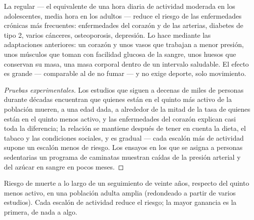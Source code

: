 \begin{proposition}\label{prop:g10:sport-and-health:health}
La  regular --- el equivalente de una hora diaria de
actividad moderada en los adolescentes, media hora en los adultos ---
reduce el riesgo de las enfermedades crónicas más frecuentes:
enfermedades del corazón y de las arterias, diabetes de tipo 2, varios
cánceres, osteoporosis, depresión. Lo hace mediante las adaptaciones
anteriores: un corazón y unos vasos que trabajan a menor presión, unos
músculos que toman con facilidad glucosa de la sangre, unos huesos que
conservan su masa, una masa corporal dentro de un intervalo saludable.
El efecto es grande --- comparable al de no fumar --- y no exige
deporte, solo movimiento.
\end{proposition}
\begin{proof}[Pruebas experimentales]
Los estudios que siguen a decenas de miles de personas durante décadas
encuentran que quienes están en el quinto más activo de la población
mueren, a una edad dada, a alrededor de la mitad de la tasa de quienes
están en el quinto menos activo, y las enfermedades del corazón
explican casi toda la diferencia; la relación se mantiene después de
tener en cuenta la dieta, el tabaco y las condiciones sociales, y es
gradual --- cada escalón más de actividad supone un escalón menos de
riesgo. Los ensayos en los que se asigna a personas sedentarias un
programa de caminatas muestran caídas de la presión arterial y del
azúcar en sangre en pocos meses.
\end{proof}

\begin{omfigure}

{\small Riesgo de muerte a lo largo de un seguimiento de veinte años,
respecto del quinto menos activo, en una población adulta amplia
(redondeado a partir de varios estudios). Cada escalón de actividad
reduce el riesgo; la mayor ganancia es la primera, de nada a algo.}
\end{omfigure}

